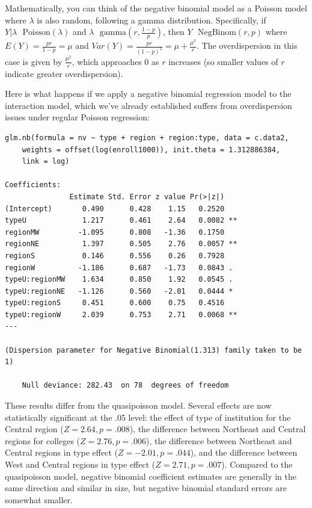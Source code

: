 \documentclass[
]{krantz}
\begin{document}
Mathematically, you can think of the negative binomial model as a Poisson model where \(\lambda\) is also random, following a gamma distribution. Specifically, if \(Y|\lambda \textrm{~ Poisson}(\lambda)\) and \(\lambda \textrm{~ gamma}(r,\frac{1-p}{p})\), then \(Y \textrm{~ NegBinom}(r,p)\) where \(E(Y)=\frac{pr}{1-p}=\mu\) and \(Var(Y)=\frac{pr}{(1-p)^2}=\mu+\frac{\mu^2}{r}\). The overdispersion in this case is given by \(\frac{\mu^2}{r}\), which approaches 0 as \(r\) increases (so smaller values of \(r\) indicate greater overdispersion).

Here is what happens if we apply a negative binomial regression model to the interaction model, which we've already established suffers from overdispersion issues under regular Poisson regression:

\begin{verbatim}
glm.nb(formula = nv ~ type + region + region:type, data = c.data2, 
    weights = offset(log(enroll1000)), init.theta = 1.312886384, 
    link = log)

Coefficients:
               Estimate Std. Error z value Pr(>|z|)   
(Intercept)       0.490      0.428    1.15   0.2520   
typeU             1.217      0.461    2.64   0.0082 **
regionMW         -1.095      0.808   -1.36   0.1750   
regionNE          1.397      0.505    2.76   0.0057 **
regionS           0.146      0.556    0.26   0.7928   
regionW          -1.186      0.687   -1.73   0.0843 . 
typeU:regionMW    1.634      0.850    1.92   0.0545 . 
typeU:regionNE   -1.126      0.560   -2.01   0.0444 * 
typeU:regionS     0.451      0.600    0.75   0.4516   
typeU:regionW     2.039      0.753    2.71   0.0068 **
---

(Dispersion parameter for Negative Binomial(1.313) family taken to be 1)

    Null deviance: 282.43  on 78  degrees of freedom
\end{verbatim}

These results differ from the quasipoisson model. Several effects are now statistically significant at the .05 level: the effect of type of institution for the Central region (\(Z=2.64, p=.008\)), the difference between Northeast and Central regions for colleges (\(Z=2.76, p=.006\)), the difference between Northeast and Central regions in type effect (\(Z=-2.01, p=.044\)), and the difference between West and Central regions in type effect (\(Z=2.71, p=.007\)). Compared to the quasipoisson model, negative binomial coefficient estimates are generally in the same direction and similar in size, but negative binomial standard errors are somewhat smaller.
\end{document}
